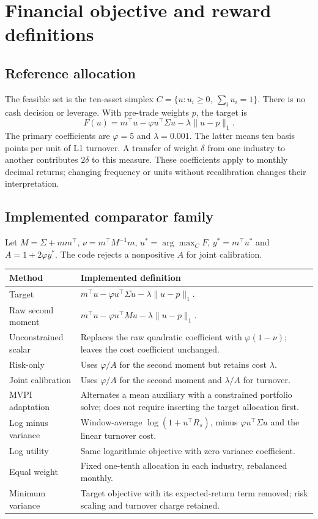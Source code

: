 \documentclass[11pt,a4paper]{article}
\begin{document}
\section{Financial objective and reward definitions}
\subsection{Reference allocation}
The feasible set is the ten-asset simplex $C=\{u:u_i\ge0,\ \sum_i u_i=1\}$. There is no cash decision or leverage. With pre-trade weights $p$, the target is
\[
F(u)=m^\top u-\varphi u^\top\Sigma u-\lambda\|u-p\|_1.
\]
The primary coefficients are $\varphi=5$ and $\lambda=0.001$. The latter means ten basis points per unit of L1 turnover. A transfer of weight $\delta$ from one industry to another contributes $2\delta$ to this measure. These coefficients apply to monthly decimal returns; changing frequency or units without recalibration changes their interpretation.

\subsection{Implemented comparator family}
Let $M=\Sigma+mm^\top$, $\nu=m^\top M^{-1}m$, $u^*=\arg\max_C F$, $y^*=m^\top u^*$ and $A=1+2\varphi y^*$. The code rejects a nonpositive $A$ for joint calibration.
\begin{longtable}{p{}p{}}
\toprule Method & Implemented definition \\\midrule
Target & $m^\top u-\varphi u^\top\Sigma u-\lambda\|u-p\|_1$.\\
Raw second moment & $m^\top u-\varphi u^\top M u-\lambda\|u-p\|_1$.\\
Unconstrained scalar & Replaces the raw quadratic coefficient with $\varphi(1-\nu)$; leaves the cost coefficient unchanged.\\
Risk-only & Uses $\varphi/A$ for the second moment but retains cost $\lambda$.\\
Joint calibration & Uses $\varphi/A$ for the second moment and $\lambda/A$ for turnover.\\
MVPI adaptation & Alternates a mean auxiliary with a constrained portfolio solve; does not require inserting the target allocation first.\\
Log minus variance & Window-average $\log(1+u^\top R_s)$, minus $\varphi u^\top\Sigma u$ and the linear turnover cost.\\
Log utility & Same logarithmic objective with zero variance coefficient.\\
Equal weight & Fixed one-tenth allocation in each industry, rebalanced monthly.\\
Minimum variance & Target objective with its expected-return term removed; risk scaling and turnover charge retained.\\\bottomrule
\end{longtable}
\end{document}
